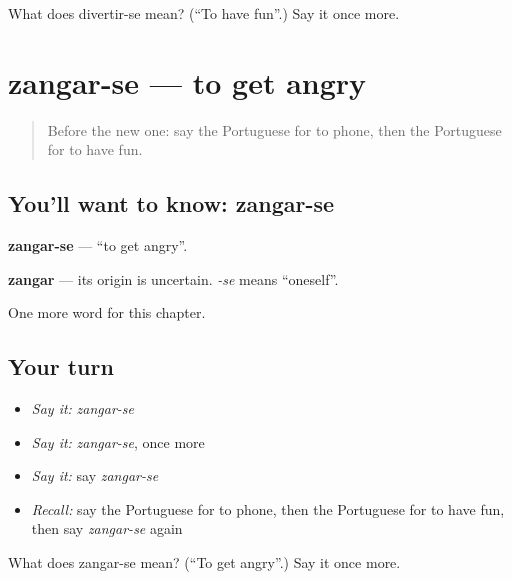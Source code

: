 \begin{tcolorbox}[breakable,colback=teal!4,colframe=teal!35!black,title={Before you move on}]
What does divertir-se mean? (\textquotedblleft{}To have fun\textquotedblright{}.) Say it once more.
\end{tcolorbox}
\section[zangar-se]{zangar-se — to get angry}

\label{lesson:PT-C233-zangar-se}



\begin{quote}
Before the new one: say the Portuguese for to phone, then the Portuguese for to have fun.
\end{quote}

\subsection*{You'll want to know: zangar-se}
\textbf{zangar-se} — \textquotedblleft{}to get angry\textquotedblright{}.

\begin{cousinweb}
\textbf{zangar} — its origin is uncertain. \emph{-se} means \textquotedblleft{}oneself\textquotedblright{}.
\end{cousinweb}

\begin{grammarlens}[title={What you've built}]
One more word for this chapter.
\end{grammarlens}

\subsection*{Your turn}
\begin{itemize}
\raggedright
  \item \emph{Say it:} \emph{zangar-se}
  \item \emph{Say it:} \emph{zangar-se}, once more
  \item \emph{Say it:} say \emph{zangar-se}
  \item \emph{Recall:} say the Portuguese for to phone, then the Portuguese for to have fun, then say \emph{zangar-se} again
\end{itemize}

\begin{tcolorbox}[breakable,colback=teal!4,colframe=teal!35!black,title={Before you move on}]
What does zangar-se mean? (\textquotedblleft{}To get angry\textquotedblright{}.) Say it once more.
\end{tcolorbox}
